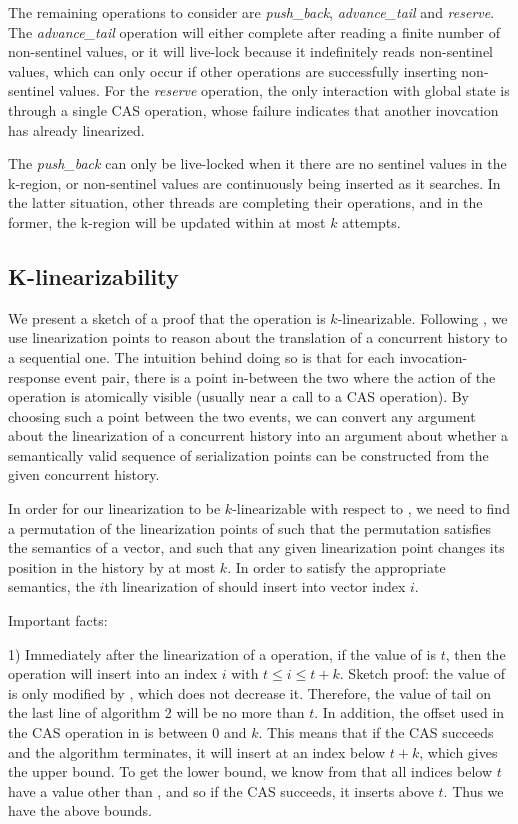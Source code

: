 \documentclass{sigplanconf}
\begin{document}
The remaining operations to consider are \emph{push\_back}, \emph{advance\_tail} and \emph{reserve}.
The \emph{advance\_tail} operation will either complete after reading a finite number of non-sentinel values, or it will live-lock because it indefinitely reads non-sentinel values, which can only occur if other operations are successfully inserting non-sentinel values. For the \emph{reserve} operation, the only interaction with global state is through a single CAS operation, whose failure indicates that another inovcation has already linearized.

The \emph{push\_back} can only be live-locked when it there are no sentinel values in the k-region, or non-sentinel values are continuously being inserted as it searches. In the latter situation, other threads are completing their operations, and in the former, the k-region will be updated within at most $k$ attempts.

\subsection{K-linearizability}

We present a sketch of a proof that the  operation is $k$-linearizable. Following \citet{dechev06}, we use linearization points to reason about the translation of a concurrent history to a sequential one. The intuition behind doing so is that for each invocation-response event pair, there is a point in-between the two where the action of the operation is atomically visible (usually near a call to a CAS operation). By choosing such a point between the two events, we can convert any argument about the linearization of a concurrent history into an argument about whether a semantically valid sequence of serialization points can be constructed from the given concurrent history.

In order for our linearization to be $k$-linearizable with respect to , we need to find a permutation of the linearization points of  such that the permutation satisfies the semantics of a vector, and such that any given linearization point changes its position in the history by at most $k$. In order to satisfy the appropriate semantics, the $i$th linearization of  should insert into vector index $i$.

Important facts:


1) Immediately after the linearization of a  operation, if the value of  is $t$, then the operation will insert into an index $i$ with $t \le i \le t + k$. Sketch proof: the value of  is only modified by , which does not decrease it. Therefore, the value of tail on the last line of algorithm 2 will be no more than $t$. In addition, the offset used in the CAS operation in  is between 0 and $k$. This means that if the CAS succeeds and the algorithm terminates, it will insert at an index below $t + k$, which gives the upper bound. To get the lower bound, we know from  that all indices below $t$ have a value other than , and so if the CAS succeeds, it inserts above $t$. Thus we have the above bounds.
\end{document}
